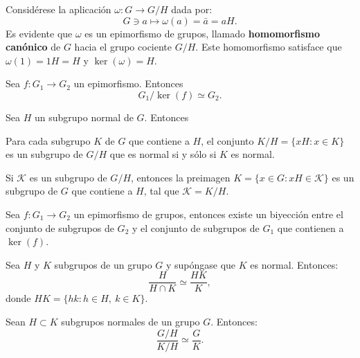 Considérese la aplicación $\omega \colon G \to G/H$ dada por: \[G \ni a \mapsto \omega(a) = 	\bar{a} = aH. \]
Es evidente que $\omega$ es un epimorfismo de grupos, llamado \textbf{homomorfismo canónico} de $G$ hacia el grupo cociente $G/H$. Este homomorfismo satisface que $\omega(1) = 1H = H$ y $\ker(\omega) = H.$ 
\begin{corolario}
Sea $f \colon G_1 \to G_2$ un epimorfismo. Entonces \[ G_1/\ker(f) \simeq G_2. \]
\end{corolario}
\begin{lema}
Sea $H$ un subgrupo normal de $G$. Entonces
\begin{bulletList}
\item Para cada subgrupo $K$ de $G$ que contiene a $H$, el conjunto $K/H = \{ xH \colon x \in K \}$ es un subgrupo de $G/H$ que es normal si y sólo si $K$ es normal.
\item Si $\mathcal{K}$ es un subgrupo de $G/H$, entonces la preimagen $K = \{ x \in G \colon xH \in \mathcal{K} \}$ es un subgrupo de $G$ que contiene a $H$, tal que $\mathcal{K} = K/H$.
\end{bulletList}
\end{lema}
\begin{teorema}
Sea $f \colon G_1 \to G_2$ un epimorfismo de grupos, entonces existe un biyección entre el conjunto de subgrupos de $G_2$ y el conjunto de subgrupos de $G_1$ que contienen a $\ker(f)$.
\end{teorema}
\begin{teorema}
Sea $H$ y $K$ subgrupos de un grupo $G$ y supóngase que $K$ es normal. Entonces: \[ \frac{H}{H \cap K} \simeq \frac{HK}{K}, \] donde $HK = \{ hk \colon h \in H, \ k \in K \}$.
\end{teorema}
\begin{teorema}
Sean $H \subset K$ subgrupos normales de un grupo $G$. Entonces:
\[\frac{G/H}{K/H} \simeq \frac{G}{K}. \]
\end{teorema}
